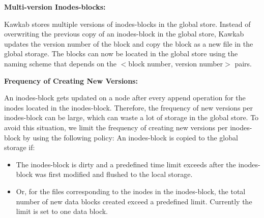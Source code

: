 \documentclass[]{article}
\newcommand{\subtopic}[1]{\vspace{1.5pt} \noindent \textbf{#1}}
\begin{document}


\subtopic{Multi-version Inodes-blocks:} 


Kawkab stores multiple versions of inodes-blocks in the global store.  Instead
of overwriting the previous copy of an inodes-block in the global store, Kawkab
updates the version number of the block and copy the block as a new file in the
global storage. The blocks can now be located in the global store using the naming
scheme that depends on the $<$block number,  version number$>$ pairs.


\subtopic{Frequency of Creating New Versions:}

An inodes-block gets  updated on a node after every append operation for the
inodes located in the inodes-block. Therefore, the frequency of new versions
per inodes-block can be large, which can waste a lot of storage in the global
store.  To avoid this situation, we limit the frequency of creating new
versions per inodes-block by using the following policy: An inodes-block is
copied to the global storage if:

\begin{itemize}

\item The inodes-block is dirty and a predefined time limit exceeds after the
      inodes-block was first modified and flushed to the local storage.

\item Or, for the files corresponding to the inodes in the inodes-block, 
      the total number of new data blocks created exceed a predefined limit.
      Currently the limit is set to one data block.

\end{itemize}
\end{document}
